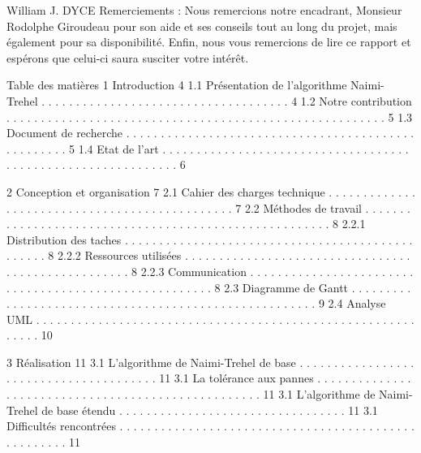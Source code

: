 \documentclass[a4paper,french,towsides,10pt]{book}
\newcommand{\clearemptydoublepage}{%
	\newpage{\pagestyle{empty}\cleardoublepage}}
\begin{document}

\renewcommand{\labelitemii}{\textasteriskcentered}

\dominitoc


\clearemptydoublepage

William J. DYCE                                                                
Remerciements :
Nous remercions notre encadrant,  Monsieur Rodolphe Giroudeau pour son aide et ses conseils tout au long du projet, mais également pour sa disponibilité.
Enfin, nous vous remercions de lire ce rapport et espérons que celui-ci saura susciter votre intérêt.



Table des matières
1 Introduction                                                                                                                                       4
  1.1 Présentation de l’algorithme Naimi-Trehel . . . . . . . . . . . . . . . . . . . . . . . . . . . . . . . . . . . . 4
  1.2 Notre contribution  . . . . . . . . . . . . . . . . . . . . . . . . . . . .  . . . . . . . . . . . . . . . . . . . . . . . . . . . 5
  1.3 Document de recherche . . . . . . . . . . . . . . . . . . . . . . . . .  . . . . . . . . . . . . . . . . . . . . . . . . . . 5
  1.4 Etat de l’art  . . . . . . . . . . . . . . . . . . . . . . . . . . . . . . .  . . . . . . . . . . . . . . . . . . . . . . . . . . . . . . 6

2 Conception et organisation                                                                                                          7
  2.1 Cahier des charges technique  . . . . . . . . . . . . . . . . . . . . . . . .  . . . . . . . . . . . . . . . . . . . . . . 7
  2.2 Méthodes de travail  . . . . . . . . . . . . . . . . . . . . . . . . . . .  . . . . . . . . . . . . . . . . . . . . . . . . . . . 8
      2.2.1 Distribution des taches  . . . . . . . . . . . . . . . . . . . . . . . . .  . . . . . . . . . . . . . . . . . . . . . . . 8
      2.2.2 Ressources utilisées  . . . . . . . . . . . . . . . . . . . . . . . . . . . . . . . . . . . . . . . . . . . . . . . . . . . 8
      2.2.3 Communication  . . . . . . . . . . . . . . . . . . . . . . . . . .  . . . . . . . . . . . . . . . . . . . . . . . . . . . . 8
  2.3 Diagramme de Gantt . . . . . . . . . . . . . . . . . . . . . . . . . . . . . . . . . . . . . . . . . . . . . . . . . . . . . . 9
  2.4 Analyse UML . . . . . . . . . . . . . . . . . . . . . . . . . . . . .  . . . . . . . . . . . . . . . . . . . . . . . . . . . . . . . 10

3 Réalisation                                                                                                                                         11
3.1 L’algorithme de Naimi-Trehel de base  . . . . . . . . . . . . . . . . . . . . . . . . . . . . . . . . . . . . . . . 11
3.1 La tolérance aux pannes . . . . . . . . . . . . . . . . . . . . . . . . . . . . . . . . . . . . . . . . . . . . . . . . . . . 11
3.1 L’algorithme de Naimi-Trehel de base étendu . . . . . . . . . . . . . . . . . . . . . . . . . . . . . . . . . 11
3.1 Difficultés rencontrées . . . . . . . . . . . . . . . . . . . . . . . . . . . . . . . . . . . . . . . . . . . . . . . . . . . . 11
\end{document}

